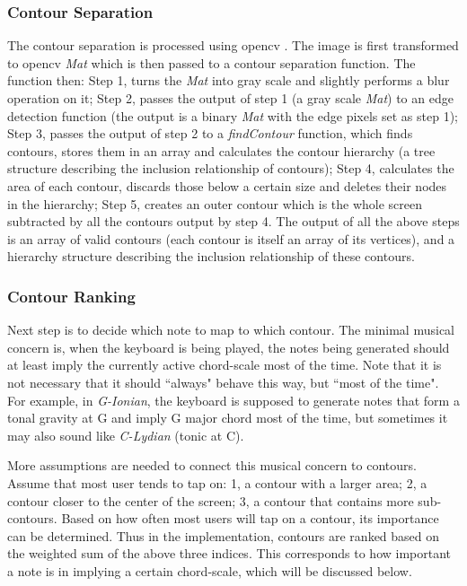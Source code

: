 \subsubsection{Contour Separation}
The contour separation is processed using opencv \cite{opencv}. The image is first transformed to opencv \textit{Mat} which is then passed to a contour separation function. The function then: Step 1, turns the \textit{Mat} into gray scale and slightly performs a blur operation on it; Step 2, passes the output of step 1 (a gray scale \textit{Mat}) to an edge detection function (the output is a binary \textit{Mat} with the edge pixels set as step 1); Step 3, passes the output of step 2 to a \textit{findContour} function, which finds contours, stores them in an array and calculates the contour hierarchy (a tree structure describing the inclusion relationship of contours); Step 4, calculates the area of each contour, discards those below a certain size and deletes their nodes in the hierarchy; Step 5, creates an outer contour which is the whole screen subtracted by all the contours output by step 4. The output of all the above steps is an array of valid contours (each contour is itself an array of its vertices), and a hierarchy structure describing the inclusion relationship of these contours.

\subsubsection{Contour Ranking}
Next step is to decide which note to map to which contour. The minimal musical concern is, when the keyboard is being played, the notes being generated should at least imply the currently active chord-scale most of the time. Note that it is not necessary that it should ``always" behave this way, but ``most of the time". For example, in \textit{G-Ionian}, the keyboard is supposed to generate notes that form a tonal gravity at G and imply G major chord most of the time, but sometimes it may also sound like \textit{C-Lydian} (tonic at C).

More assumptions are needed to connect this musical concern to contours. Assume that most user tends to tap on: 1, a contour with a larger area; 2, a contour closer to the center of the screen; 3, a contour that contains more sub-contours. Based on how often most users will tap on a contour, its importance can be determined. Thus in the implementation, contours are ranked based on the weighted sum of
the above three indices. This corresponds to how important a note is in implying a certain chord-scale, which will be discussed below.

